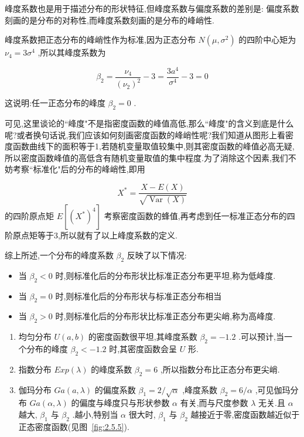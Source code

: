 峰度系数也是用于描述分布的形状特征,但峰度系数与偏度系数的差别是:
偏度系数刻画的是分布的对称性,而峰度系数刻画的是分布的峰峭性.

峰度系数把正态分布的峰峭性作为标准,因为正态分布 $ N\left(\mu, \sigma^{2}\right) $ 的四阶中心矩为 $ \nu_{4}=3 \sigma^{4} $ ,所以其峰度系数为

\[
\beta_{2}=\frac{\nu_{4}}{\left(\nu_{2}\right)^{2}}-3=\frac{3 a^{4}}{\sigma^{4}}-3=0
\]

这说明:任一正态分布的峰度 $ \beta_{2}=0 $ .

可见,这里谈论的``峰度"不是指密度函数的峰值高低,那么``峰度"的含义到底是什么呢?或者换句话说,我们应该如何刻画密度函数的峰峭性呢?我们知道从图形上看密度函数曲线下的面积等于1,若随机变量取值较集中,则其密度函数的峰值必高无疑,所以密度函数峰值的高低含有随机变量取值的集中程度.为了消除这个因素,我们不妨考察``标准化"后的分布的峰峭性,即用

\[
X^{*}=\frac{X-E(X)}{\sqrt{\operatorname{Var}(X)}}
\]
的四阶原点矩 $ E\left[\left(X^{*}\right)^{4}\right] $ 考察密度函数的蜂值,再考虑到任一标准正态分布的四阶原点矩等于3,所以就有了以上峰度系数的定义.

综上所述,一个分布的峰度系数 $ \beta_{2} $ 反映了以下情况:

\begin{itemize}
	\item 当 $ \beta_{2}<0 $ 时,则标准化后的分布形状比标准正态分布更平坦,称为低峰度.
	\item 当 $ \beta_{2}=0 $ 时,则标准化后的分布形状与标准正态分布相当
	\item 当 $ \beta_{2}>0 $ 时,则标准化后的分布形状比标准正态分布更尖峭,称为高峰度.
\end{itemize}

\begin{example}\label{exam:2.75}
	\begin{enumerate}
		\item 均匀分布 $ U(a,b) $ 的密度函数很平坦,其峰度系数 $ \beta_{2}= -1.2 $ .可以预计,当一个分布的峰度 $ \beta_{2}<-1.2 $ 时,其密度函数会呈 $ U $ 形.
		\item 指数分布 $ E x p(\lambda) $ 的峰度系数 $ \beta_{2}=6 $ ,所以指数分布比正态分布更尖峭.
		\item 伽玛分布 $ G a(a, \lambda) $ 的偏度系数 $ \beta_{1}=2 / \sqrt{\alpha} $ ,峰度系数 $ \beta_{2}=6 / \alpha $ ,可见伽玛分布 $ G a(\alpha, \lambda) $ 的偏度与峰度只与形状参数 $ \alpha $ 有关,而与尺度参数 $ \lambda $ 无关.且 $ \alpha $ 越大, $ \beta_{1} $ 与 $ \beta_{2} $ .越小,特别当 $ \alpha $ 很大时, $ \beta_{1} $ 与 $ \beta_{2} $ 越接近于零,密度函数越近似于正态密度函数(见图~\ref{fig:2.5.5}).
	\end{enumerate}
\end{example}

